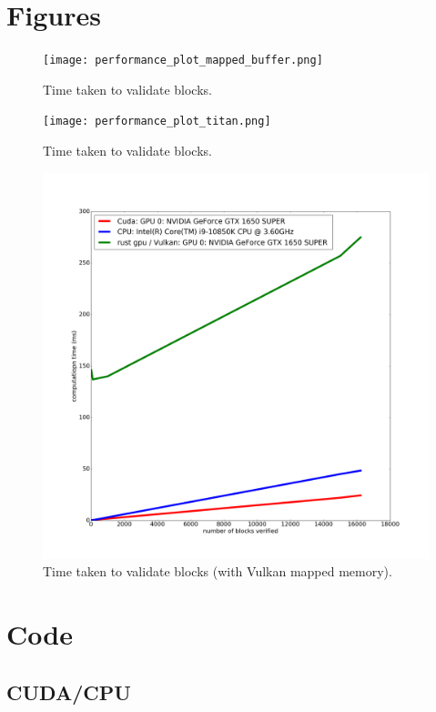 \documentclass{article}
\begin{document}
\section{Figures}
\begin{figure}[H]
    \centering
    \texttt{[image: performance\_plot\_mapped\_buffer.png]}
    \caption{Time taken to validate blocks.}
    \label{fig:my_label}
\end{figure}
\begin{figure}[H]
    \centering
    \texttt{[image: performance\_plot\_titan.png]}
    \caption{Time taken to validate blocks.}
    \label{fig:my_label}
\end{figure}
\begin{figure}[H]
    \includegraphics[width=1\linewidth]{performance_plot.png}
    \caption{Time taken to validate blocks (with Vulkan mapped memory).}
    \label{fig:my_label}
\end{figure}

\section{Code}

\subsection{CUDA/CPU}
\end{document}
